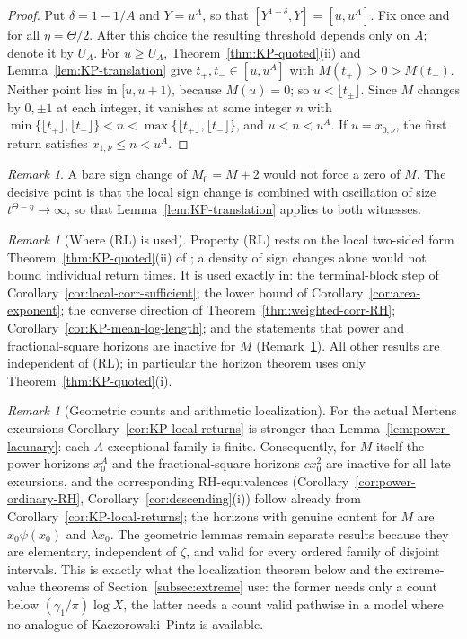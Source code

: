 \documentclass[11pt]{amsart}
\numberwithin{equation}{section}
\theoremstyle{plain}
\theoremstyle{definition}
\theoremstyle{remark}
\newtheorem{remark}[theorem]{Remark}
\begin{document}
\begin{proof}
Put $\delta=1-1/A$ and $Y=u^A$, so that
$[Y^{1-\delta},Y]=[u,u^A]$.  Fix once and for all
$\eta=\Theta/2$.  After this choice the resulting threshold depends only
on $A$; denote it by $U_A$.  For $u\ge U_A$,
Theorem~\ref{thm:KP-quoted}(ii) and Lemma~\ref{lem:KP-translation} give
$t_+,t_-\in[u,u^A]$ with $M(t_+)>0>M(t_-)$. Neither point lies in $[u,u+1)$,
because $M(u)=0$; so $u<\lfloor t_\pm\rfloor$. Since $M$ changes by
$0,\pm1$ at each integer, it vanishes at some integer $n$ with
$\min\{\lfloor t_+\rfloor,\lfloor t_-\rfloor\}<n<\max\{\lfloor t_+\rfloor,\lfloor t_-\rfloor\}$, and $u<n<u^A$. If
$u=x_{0,\nu}$, the first return satisfies $x_{1,\nu}\le n<u^A$.
\end{proof}

\begin{remark}
A bare sign change of $M_0=M+2$ would not force a zero of $M$. The
decisive point is that the local sign change is combined with oscillation of
size $t^{\Theta-\eta}\to\infty$, so that Lemma~\ref{lem:KP-translation}
applies to both witnesses.
\end{remark}

\begin{remark}[Where (RL) is used]
\label{rem:RL-dependence}
Property (RL) rests on the local two-sided form
Theorem~\ref{thm:KP-quoted}(ii) of \cite{KP86}; a density of sign changes
alone would not bound individual return times. It is used exactly in:
the terminal-block step of Corollary~\ref{cor:local-corr-sufficient}; the
lower bound of Corollary~\ref{cor:area-exponent}; the converse direction of
Theorem~\ref{thm:weighted-corr-RH}; Corollary~\ref{cor:KP-mean-log-length};
and the statements that power and fractional-square horizons are inactive
for $M$ (Remark~\ref{rem:geom-vs-arith}). All other results are independent
of (RL); in particular the horizon theorem uses only
Theorem~\ref{thm:KP-quoted}(i).
\end{remark}

\begin{remark}[Geometric counts and arithmetic localization]
\label{rem:geom-vs-arith}
For the actual Mertens excursions Corollary~\ref{cor:KP-local-returns} is
stronger than Lemma~\ref{lem:power-lacunary}: each $A$-exceptional family is
finite. Consequently, for $M$ itself the power horizons $x_0^A$ and the
fractional-square horizons $cx_0^2$ are inactive for all late excursions,
and the corresponding RH-equivalences (Corollary~\ref{cor:power-ordinary-RH},
Corollary~\ref{cor:descending}(i)) follow already from
Corollary~\ref{cor:KP-local-returns}; the horizons with genuine content for
$M$ are $x_0\psi(x_0)$ and $\lambda x_0$. The geometric lemmas remain separate results because they are
elementary, independent of $\zeta$, and valid for every ordered family of
disjoint intervals. This is exactly what the localization theorem below and
the extreme-value theorems of Section~\ref{subsec:extreme} use: the former
needs only a count below $(\gamma_1/\pi)\log X$, the latter needs a count
valid pathwise in a model where no analogue of Kaczorowski--Pintz is
available.
\end{remark}
\end{document}
